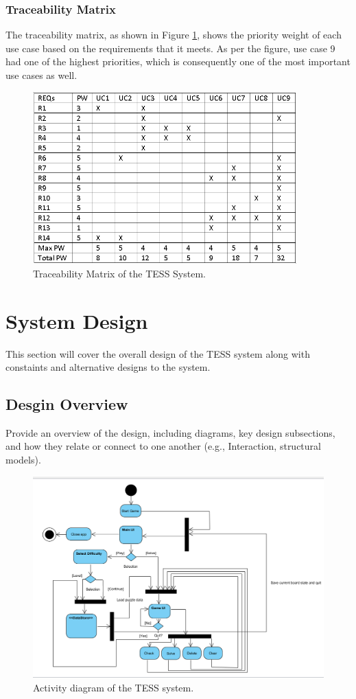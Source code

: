\documentclass{article}
\begin{document}
\subsubsection{Traceability Matrix}
The traceability matrix, as shown in Figure \ref{fig:traceabilitymatrix}, shows the priority weight of each use case based on the requirements that it meets. As per the figure, use case 9 had one of the highest priorities, which is consequently one of the most important use cases as well.
\begin{figure}[h!]\centering
\includegraphics[width=4.0in]{./Figure/Traceability_Matrix.PNG}
\caption{Traceability Matrix of the TESS System.}\label{fig:traceabilitymatrix}
\end{figure}

\section{System Design}
This section will cover the overall design of the TESS system along with constaints and alternative designs to the system.

\subsection{Desgin Overview} \todo{}
Provide an overview of the design, including diagrams, key design subsections, and how they relate or connect to one another (e.g., Interaction, structural models).

\begin{figure}[h!]
	\centering
	\includegraphics[width=5.0in]{./Figure/Activity_Diagram.PNG}
	\caption{Activity diagram of the TESS system.}\label{fig:activitydiagram}
\end{figure}
\end{document}
